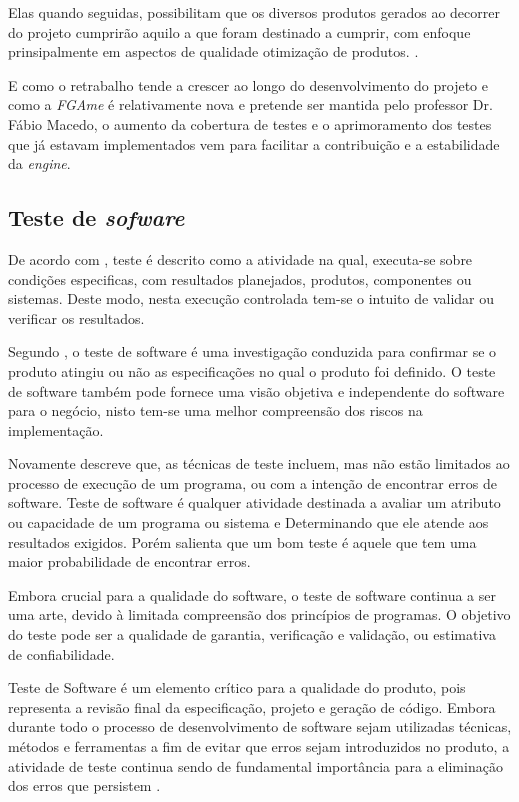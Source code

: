 Elas quando seguidas, possibilitam que os diversos produtos gerados ao decorrer do projeto cumprirão aquilo a que foram destinado a cumprir, com enfoque prinsipalmente em aspectos de qualidade otimização de produtos.
.\cite{gregor}

E como o retrabalho tende a crescer ao longo do desenvolvimento do projeto e como a \textit{FGAme} é relativamente nova e pretende ser mantida pelo professor Dr. Fábio Macedo, o aumento da cobertura de testes e o aprimoramento dos testes que já estavam implementados vem para facilitar a contribuição e a estabilidade da \textit{engine}.


\subsection{Teste de \textit{sofware}}
	De acordo com \cite{IEEE}, teste é descrito como a atividade na qual, executa-se sobre condições especificas, com resultados planejados, produtos, componentes ou sistemas. Deste modo, nesta execução controlada tem-se o intuito de validar ou verificar os resultados.


Segundo \cite{artigo_intro_teste}, o teste de software é uma investigação conduzida para confirmar se o produto atingiu ou não as especificações no qual o produto foi definido. O teste de software também pode fornece uma visão objetiva e independente do software para o negócio, nisto tem-se uma melhor compreensão dos riscos na implementação.

Novamente \cite{artigo_intro_teste} descreve que, as técnicas de teste incluem, mas não estão limitados ao processo de execução de um programa, ou com a intenção de encontrar erros de software. Teste de software é qualquer atividade destinada a avaliar um atributo ou capacidade de um programa ou sistema e Determinando que ele atende aos resultados exigidos. Porém \cite{artigo_intro_teste} salienta que um bom teste é aquele que tem uma maior probabilidade de encontrar erros.

Embora crucial para a qualidade do software, o teste de software continua a ser uma arte, devido à limitada compreensão dos princípios de programas.
 O objetivo do teste pode ser a qualidade de garantia, verificação e validação, ou estimativa de confiabilidade.

Teste de Software é um elemento crítico para a qualidade do produto, pois representa a revisão final da especificação, projeto e geração de código. Embora durante todo o processo de desenvolvimento de software sejam utilizadas técnicas, métodos e ferramentas a fim de evitar que erros sejam introduzidos no produto, a atividade de teste continua sendo de fundamental importância para a eliminação dos erros que persistem \cite{maldonado}.

